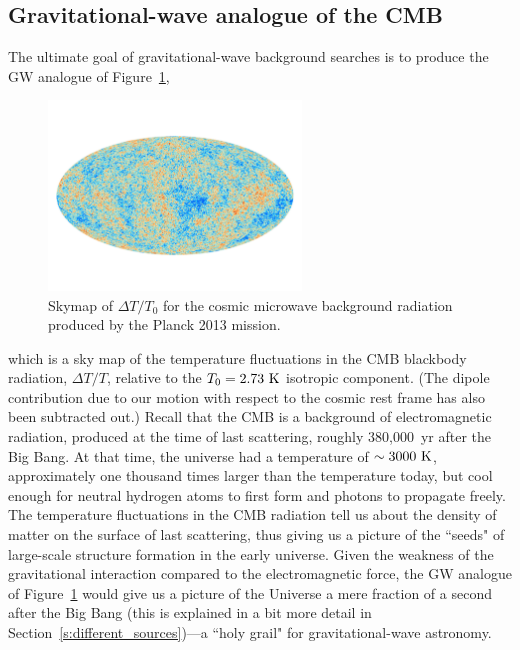 \documentclass[11pt]{article}
\numberwithin{equation}{section}
\begin{document}
\subsection{Gravitational-wave analogue of the CMB}

The ultimate goal of gravitational-wave background
searches is to produce the GW analogue of Figure~\ref{f:CMB},
%
\begin{figure}[htbp!]
\begin{center}
\includegraphics[width=0.6\textwidth]{Figures/CMB}
\caption{Skymap of $\Delta T/T_0$ for the cosmic microwave background
radiation produced by the Planck 2013 mission.}
\label{f:CMB}
\end{center}
\end{figure}
%
which is a sky map of the temperature fluctuations in 
the CMB blackbody radiation, $\Delta T/T$, relative 
to the $T_0 = 2.73~{\rm K}$ isotropic component.
(The dipole contribution due to our motion with respect 
to the cosmic rest frame has also been subtracted out.)
Recall that the CMB is a background of electromagnetic
radiation, produced at the time of last scattering,
roughly 380,000~yr after the Big Bang.
At that time, the universe had a temperature of 
$\sim 3000~{\rm K}$, approximately one thousand times 
larger than the temperature today, but cool enough for 
neutral hydrogen atoms to first form and photons to 
propagate freely.
The temperature fluctuations in the CMB radiation tell
us about the density of matter on the surface of last 
scattering, thus giving us a picture of the ``seeds" of 
large-scale structure formation in the early universe.
Given the weakness of the gravitational interaction 
compared to the electromagnetic force, the GW analogue 
of Figure~\ref{f:CMB} would give us a picture of the 
Universe a mere fraction of a second after the Big
Bang (this is explained in a bit more detail in 
Section~\ref{s:different_sources})---a ``holy grail" 
for gravitational-wave astronomy.
\end{document}
